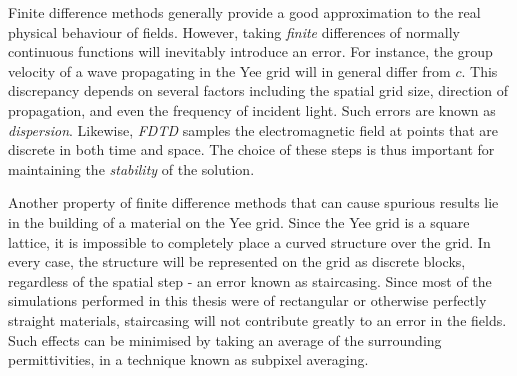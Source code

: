 Finite difference methods generally provide a good approximation to the real physical behaviour of fields. However, taking \textit{finite} differences of normally continuous functions will inevitably introduce an error. For instance, the group velocity of a wave propagating in the Yee grid will in general differ from $c$. This discrepancy depends on several factors including the spatial grid size, direction of propagation, and even the frequency of incident light. Such errors are known as \textit{dispersion}. Likewise, \textit{FDTD} samples the electromagnetic field at points that are discrete in both time and space. The choice of these steps is thus important for maintaining the \textit{stability} of the solution.

Another property of finite difference methods that can cause spurious results lie in the building of a material on the Yee grid. Since the Yee grid is a square lattice, it is impossible to completely place a curved structure over the grid. In every case, the structure will be represented on the grid as discrete blocks, regardless of the spatial step - an error known as staircasing. Since most of the simulations performed in this thesis were of rectangular or otherwise perfectly straight materials, staircasing will not contribute greatly to an error in the fields. Such effects can be minimised by taking an average of the surrounding permittivities, in a technique known as subpixel averaging.


